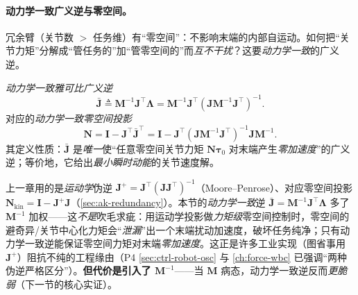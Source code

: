 \paragraph{动力学一致广义逆与零空间。}
冗余臂（关节数 $>$ 任务维）有“零空间”：不影响末端的内部自运动。如何把“关节力矩”分解成“管任务的”加“管零空间的”而\emph{互不干扰}？这要\emph{动力学一致}的广义逆。

\begin{definition}
\label{def:ad-dyn-consistent}
\emph{动力学一致雅可比广义逆}
\begin{equation}
  \bar{\mathbf{J}}\triangleq\mathbf{M}^{-1}\mathbf{J}^\top\boldsymbol{\Lambda}=\mathbf{M}^{-1}\mathbf{J}^\top(\mathbf{J}\mathbf{M}^{-1}\mathbf{J}^\top)^{-1}.
  \label{eq:ad-Jbar}
\end{equation}
对应的\emph{动力学一致零空间投影}
\begin{equation}
  \mathbf{N}=\mathbf{I}-\mathbf{J}^\top\bar{\mathbf{J}}^\top=\mathbf{I}-\mathbf{J}^\top(\mathbf{J}\mathbf{M}^{-1}\mathbf{J}^\top)^{-1}\mathbf{J}\mathbf{M}^{-1}.
  \label{eq:ad-N-dyn}
\end{equation}
其定义性质：$\bar{\mathbf{J}}$ 是\emph{唯一}使“任意零空间关节力矩 $\mathbf{N}\boldsymbol{\tau}_0$ 对末端产生\emph{零加速度}”的广义逆；等价地，它给出\emph{最小瞬时动能}的关节速度解。
\end{definition}

\begin{insight}
\label{ins:ad-consistent-vs-mp}
上一章用的是\emph{运动学}伪逆 $\mathbf{J}^+=\mathbf{J}^\top(\mathbf{J}\mathbf{J}^\top)^{-1}$（Moore--Penrose）、对应零空间投影 $\mathbf{N}_{\text{kin}}=\mathbf{I}-\mathbf{J}^+\mathbf{J}$（\cref{sec:ak-redundancy}）。本节的\emph{动力学一致}逆 $\bar{\mathbf{J}}=\mathbf{M}^{-1}\mathbf{J}^\top\boldsymbol{\Lambda}$ 多了 $\mathbf{M}^{-1}$ 加权——这\emph{不是}吹毛求疵：用运动学投影做\emph{力矩级}零空间控制时，零空间的避奇异/关节中心化力矩会“\emph{泄漏}”出一个末端扰动加速度，破坏任务纯净；只有动力学一致逆能保证零空间力矩对末端\emph{零加速度}。这正是许多工业实现（图省事用 $\mathbf{J}^+$）阻抗不纯的工程缘由（P4 \cref{sec:ctrl-robot-osc} 与 \cref{ch:force-wbc} 已强调“两种伪逆严格区分”）。\textbf{但代价是引入了 $\mathbf{M}^{-1}$}——当 $\mathbf{M}$ 病态，动力学一致逆反而\emph{更脆弱}（下一节的核心实证）。
\end{insight}

